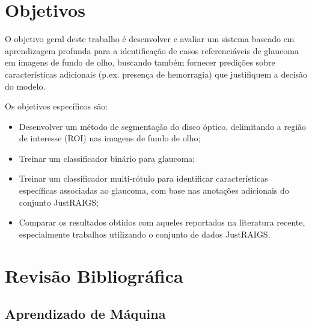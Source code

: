 \documentclass[12pt]{article}
\begin{document}
\bigskip

\section{Objetivos}
\label{sec:objetivo}

O objetivo geral deste trabalho é desenvolver e avaliar um sistema baseado em aprendizagem profunda para a identificação de casos referenciáveis de glaucoma em imagens de fundo de olho, 
buscando também fornecer predições sobre características adicionais (p.ex. presença de hemorragia) que justifiquem a decisão do modelo.

Os objetivos específicos são:
\begin{itemize}
    \item Desenvolver um método de segmentação do disco óptico, delimitando a região de interesse (ROI) nas imagens de fundo de olho;
    \item Treinar um classificador binário para glaucoma;
    \item Treinar um classificador multi-rótulo para identificar características específicas associadas ao glaucoma, com base nas anotações adicionais do conjunto JustRAIGS;
    \item Comparar os resultados obtidos com aqueles reportados na literatura recente, especialmente trabalhos utilizando o conjunto de dados JustRAIGS.
\end{itemize}

\bigskip

\section{Revisão Bibliográfica}
\label{sec:review}

\subsection{Aprendizado de Máquina}
\label{sec:review:machine_learning}
\end{document}
